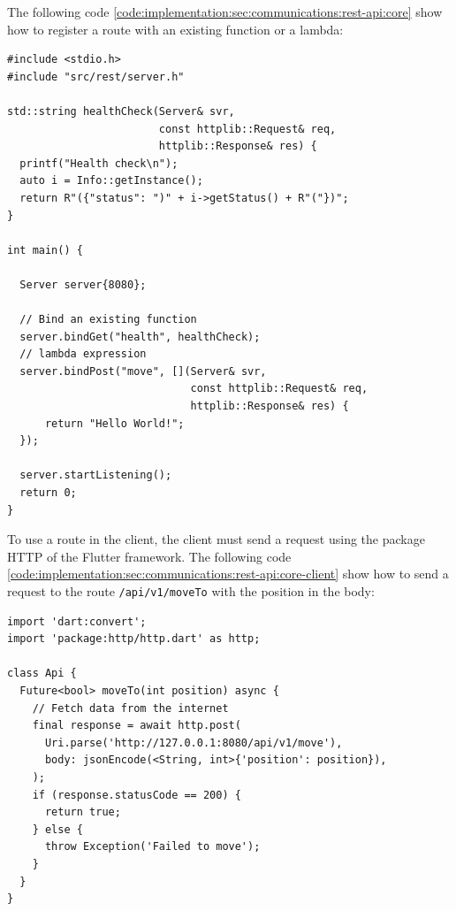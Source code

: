 The following code \ref{code:implementation:sec:communications:rest-api:core} show how to register a route with an existing function or a lambda:

\begin{code}
  \label{code:implementation:sec:communications:rest-api:core}
  \begin{verbatim}
#include <stdio.h>
#include "src/rest/server.h"

std::string healthCheck(Server& svr,
                        const httplib::Request& req,
                        httplib::Response& res) {
  printf("Health check\n");
  auto i = Info::getInstance();
  return R"({"status": ")" + i->getStatus() + R"("})";
}

int main() {

  Server server{8080};

  // Bind an existing function
  server.bindGet("health", healthCheck);
  // lambda expression
  server.bindPost("move", [](Server& svr,
                             const httplib::Request& req,
                             httplib::Response& res) {
      return "Hello World!";
  });

  server.startListening();
  return 0;
}
  \end{verbatim}
\end{code}

To use a route in the client, the client must send a request using the package HTTP of the Flutter framework.
The following code \ref{code:implementation:sec:communications:rest-api:core-client} show how to send a request to the route \texttt{/api/v1/moveTo} with the position in the body:

\begin{code}
  \label{code:implementation:sec:communications:rest-api:core-client}
  \begin{verbatim}
import 'dart:convert';
import 'package:http/http.dart' as http;

class Api {
  Future<bool> moveTo(int position) async {
    // Fetch data from the internet
    final response = await http.post(
      Uri.parse('http://127.0.0.1:8080/api/v1/move'),
      body: jsonEncode(<String, int>{'position': position}),
    );
    if (response.statusCode == 200) {
      return true;
    } else {
      throw Exception('Failed to move');
    }
  }
}
  \end{verbatim}
\end{code}


